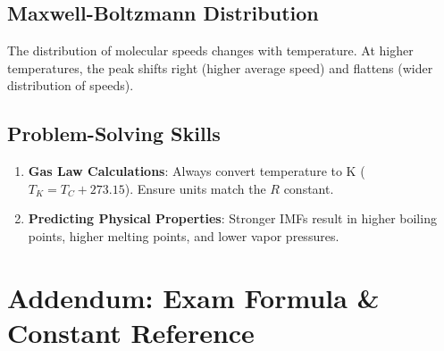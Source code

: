 \documentclass[11pt]{article}
\begin{document}
\subsection{Maxwell-Boltzmann Distribution}
The distribution of molecular speeds changes with temperature. At higher temperatures, the peak shifts right (higher average speed) and flattens (wider distribution of speeds).

\begin{center}
\end{center}

\subsection{Problem-Solving Skills}
\begin{enumerate}
    \item \textbf{Gas Law Calculations}: Always convert temperature to \si{\kelvin} ($T_K = T_C + 273.15$). Ensure units match the $R$ constant.
    \item \textbf{Predicting Physical Properties}: Stronger IMFs result in higher boiling points, higher melting points, and lower vapor pressures.
\end{enumerate}

\newpage

\section*{Addendum: Exam Formula \& Constant Reference}
\end{document}

